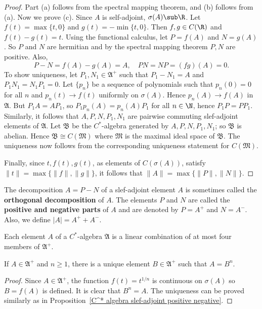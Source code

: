 \begin{proof}
Part (a) follows from the spectral mapping theorem, and (b) follows from (a). Now we prove (c). Since $A$ is self-adjoint, $\sigma(A)\sub\R$. Let $f(t)=\max\{t,0\}$ and $g(t)=-\min\{t,0\}$. Then $f,g\in C(\R)$ and $f(t)-g(t)=t$. Using the functional calculus, let $P=f(A)$ and $N=g(A)$. So $P$ and $N$ are hermitian and by the spectral mapping theorem $P,N$ are positive. Also,
\[P-N=f(A)-g(A)=A,\quad PN=NP=(fg)(A)=0.\]
To show uniqueness, let $P_1,N_1\in\mathfrak{A}^+$ such that $P_1-N_1=A$ and $P_1N_1=N_1P_1=0$. Let $\{p_n\}$ be a sequence of polynomials such that $p_n(0)=0$ for all $n$ and $p_n(t)\to f(t)$ uniformly on $\sigma(A)$. Hence $p_n(A)\to f(A)$ in $\mathfrak{A}$. But $P_1A=AP_1$, so $P_1p_n(A)=p_n(A)P_1$ for all $n\in\N$, hence $P_1P=PP_1$. Similarly, it follows that $A,P,N,P_1,N_1$ are pairwise commuting slef-adjoint elements of $\mathfrak{A}$. Let $\mathfrak{B}$ be the $C^*$-algebra generated by $A,P,N,P_1,N_1$; so $\mathfrak{B}$ is abelian. Hence $\mathfrak{B}\cong C(\mathfrak{M})$ where $\mathfrak{M}$ is the maximal ideal space of $\mathfrak{B}$. The uniqueness now follows from the corresponding uniqueness statement for $C(\mathfrak{M})$.\par
Finally, since $t,f(t),g(t)$, as elements of $C(\sigma(A))$, satisfy $\|t\|=\max\{\|f\|,\|g\|\}$, it follows that $\|A\|=\max\{\|P\|,\|N\|\}$.
\end{proof}
The decomposition $A=P-N$ of a slef-adjoint element $A$ is sometimes called the \textbf{orthogonal decomposition} of $A$. The elements $P$ and $N$ are called the \textbf{positive and negative parts} of $A$ and are denoted by $P=A^+$ and $N=A^-$. Also, we define $|A|=A^++A^-$.
\begin{corollary}
Each element $A$ of a $C^*$-algebra $\mathfrak{A}$ is a linear combination of at most four members of $\mathfrak{A}^+$.
\end{corollary}
\begin{proposition}\label{C^* algebra root of positive}
If $A\in\mathfrak{A}^+$ and $n\geq 1$, there is a unique element $B\in\mathfrak{A}^+$ such that $A=B^n$.
\end{proposition}
\begin{proof}
Since $A\in\mathfrak{A}^+$, the function $f(t)=t^{1/n}$ is continuous on $\sigma(A)$ so $B=f(A)$ is defined. It is clear that $B^n=A$. The uniqueness can be proved similarly as in Proposition~\ref{C^* algebra slef-adjoint positive negative}.
\end{proof}
